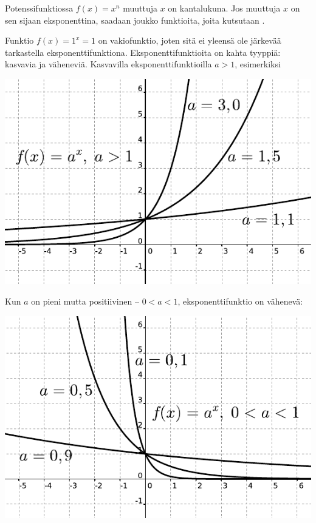 Potenssifunktiossa $f(x) = x^n$ muuttuja $x$ on kantalukuna. Jos muuttuja $x$ on sen sijaan eksponenttina, saadaan joukko funktioita, joita kutsutaan .


Funktio $f(x) = 1^x = 1$ on vakiofunktio, joten sitä ei yleensä ole järkevää tarkastella eksponenttifunktiona. Eksponenttifunktioita on kahta tyyppiä: kasvavia ja väheneviä. Kasvavilla eksponenttifunktioilla $a>1$, esimerkiksi

\begin{center}
\includegraphics{pictures/apotenssiinxaisompikuinyksi.pdf}
\end{center}

Kun $a$ on pieni mutta positiivinen –  $0<a<1$, eksponenttifunktio on vähenevä:

\begin{center}
\includegraphics{pictures/apotenssiinxaisompikuinnolla.pdf}
\end{center}

